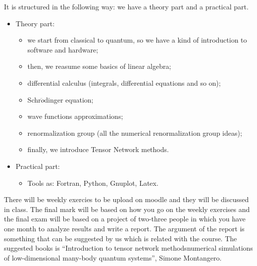 \documentclass[../main/main.tex]{subfiles}
\begin{document}
It is structured in the following way:  we have a theory part and a practical part.
\begin{itemize}
\item Theory part:
    \begin{itemize}
        \item we start from classical to quantum, so we have a kind of introduction to software and hardware;
        \item then, we reasume some basics of linear algebra;
        \item differential calculus (integrals, differential equations and so on);
        \item Schr$\ddot{o}$dinger equation;
        \item wave functions approximations;
        \item renormalization group (all the numerical renormalization group ideas);
        \item finally, we introduce Tensor Network methods.
    \end{itemize}
\item Practical part:
    \begin{itemize}
        \item Tools as: Fortran, Python, Gnuplot, Latex.
    \end{itemize}
\end{itemize}
There will be weekly exercies to be upload on moodle and they will be discussed in class. The final mark will be based on how you go on the weekly exercises and the final exam will be based on a project of two-three people in which you have one month to analyze results and write a report. The argument of the report is something that can be suggested by us which is related with the course. The suggested books is “Introduction to tensor network methodsnumerical simulations of low-dimensional many-body quantum systems”, Simone Montangero. 
\end{document}
